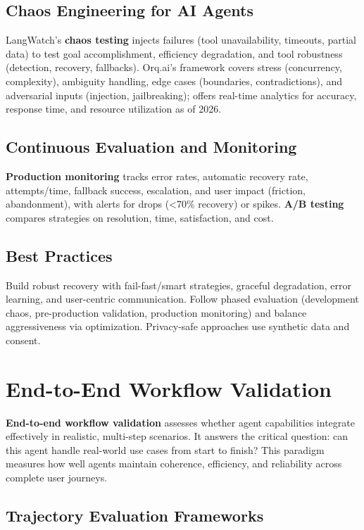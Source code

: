 \begin{TNtwocol}
\subsection*{Chaos Engineering for AI Agents}

LangWatch’s \textbf{chaos testing} injects failures (tool unavailability, timeouts, partial data) to test goal accomplishment, efficiency degradation, and tool robustness (detection, recovery, fallbacks). Orq.ai’s framework covers stress (concurrency, complexity), ambiguity handling, edge cases (boundaries, contradictions), and adversarial inputs (injection, jailbreaking); offers real-time analytics for accuracy, response time, and resource utilization as of 2026.

\subsection*{Continuous Evaluation and Monitoring}

\textbf{Production monitoring} tracks error rates, automatic recovery rate, attempts/time, fallback success, escalation, and user impact (friction, abandonment), with alerts for drops (<70\% recovery) or spikes. \textbf{A/B testing} compares strategies on resolution, time, satisfaction, and cost.
​

\subsection*{Best Practices}

Build robust recovery with fail-fast/smart strategies, graceful degradation, error learning, and user-centric communication. Follow phased evaluation (development chaos, pre-production validation, production monitoring) and balance aggressiveness via optimization. Privacy-safe approaches use synthetic data and consent.
​

\section{End-to-End Workflow Validation}

\textbf{End-to-end workflow validation} assesses whether agent capabilities integrate effectively in realistic, multi-step scenarios. It answers the critical question: can this agent handle real-world use cases from start to finish? This paradigm measures how well agents maintain coherence, efficiency, and reliability across complete user journeys.
​

\subsection*{Trajectory Evaluation Frameworks}


\end{TNtwocol}
